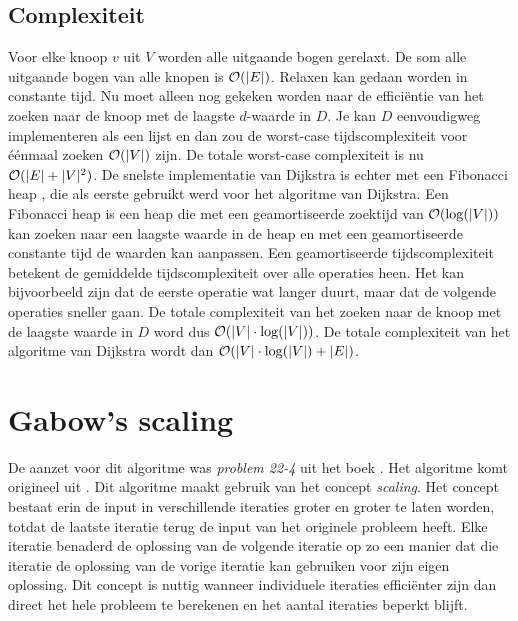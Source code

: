\documentclass[conference]{IEEEtran}
\theoremstyle{definition}
\DeclarePairedDelimiter{\card}{\vert}{\vert}  %
\begin{document}
\subsection{Complexiteit}
Voor elke knoop $v$ uit $V$ worden alle uitgaande bogen gerelaxt. De som alle uitgaande bogen van alle knopen is $\mathcal{O}(\card{E})$. Relaxen kan gedaan worden in constante tijd. Nu moet alleen nog gekeken worden naar de efficiëntie van het zoeken naar de knoop met de laagste $d$-waarde in $D$. Je kan $D$ eenvoudigweg implementeren als een lijst en dan zou de worst-case tijdscomplexiteit voor éénmaal zoeken $\mathcal{O}(\card{V})$ zijn. De totale worst-case complexiteit is nu $\mathcal{O}(\card{E} + \card{V}^2)$.
De snelste implementatie van Dijkstra is echter met een Fibonacci heap \cite{Fibonacci}, die als eerste gebruikt werd voor het algoritme van Dijkstra. Een Fibonacci heap is een heap die met een geamortiseerde zoektijd van $\mathcal{O}(\log(\card{V}))$ kan zoeken naar een laagste waarde in de heap en met een geamortiseerde constante tijd de waarden kan aanpassen. Een geamortiseerde tijdscomplexiteit betekent de gemiddelde tijdscomplexiteit over alle operaties heen. Het kan bijvoorbeeld zijn dat de eerste operatie wat langer duurt, maar dat de volgende operaties sneller gaan. De totale complexiteit van het zoeken naar de knoop met de laagste waarde in $D$ word dus $\mathcal{O}(\card{V} \cdot \log(\card{V}))$. De totale complexiteit van het algoritme van Dijkstra wordt dan $\mathcal{O}(\card{V} \cdot \log(\card{V}) + \card{E})$.

\section{Gabow's scaling}
De aanzet voor dit algoritme was \textit{problem 22-4} uit het boek  \cite{Introduction}. Het algoritme komt origineel uit  \cite{Scaling}.
Dit algoritme maakt gebruik van het concept \textit{scaling}. Het concept bestaat erin de input in verschillende iteraties groter en groter te laten worden, totdat de laatste iteratie terug de input van het originele probleem heeft. Elke iteratie benaderd de oplossing van de volgende iteratie op zo een manier dat die iteratie de oplossing van de vorige iteratie kan gebruiken voor zijn eigen oplossing. Dit concept is nuttig wanneer individuele iteraties efficiënter zijn dan direct het hele probleem te berekenen en het aantal iteraties beperkt blijft.
\end{document}
